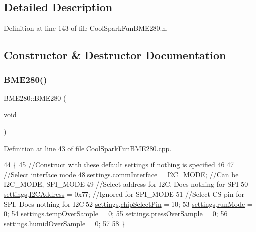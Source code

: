 \subsection{Detailed Description}


Definition at line 143 of file Cool\+Spark\+Fun\+B\+M\+E280.\+h.



\subsection{Constructor \& Destructor Documentation}
\mbox{\label{class_b_m_e280_a9b9354e010528a0c3d452aa2459b808c}} 
\subsubsection{\texorpdfstring{B\+M\+E280()}{BME280()}}
{\footnotesize\ttfamily B\+M\+E280\+::\+B\+M\+E280 (\begin{DoxyParamCaption}\item[{void}]{ }\end{DoxyParamCaption})}



Definition at line 43 of file Cool\+Spark\+Fun\+B\+M\+E280.\+cpp.


\begin{DoxyCode}
44 \{
45     \textcolor{comment}{//Construct with these default settings if nothing is specified}
46 
47     \textcolor{comment}{//Select interface mode}
48     \hyperlink{class_b_m_e280_af06253eb2f8ad4b5fabb858bc4a973bf}{settings}.\hyperlink{struct_sensor_settings_a5bf116387c543a6ea5732976424e8cb1}{commInterface} = \hyperlink{_cool_spark_fun_b_m_e280_8h_a5cd01756030509b764d43a2b8c94fce8}{I2C\_MODE}; \textcolor{comment}{//Can be I2C\_MODE, SPI\_MODE}
49     \textcolor{comment}{//Select address for I2C.  Does nothing for SPI}
50     \hyperlink{class_b_m_e280_af06253eb2f8ad4b5fabb858bc4a973bf}{settings}.\hyperlink{struct_sensor_settings_af8103021dbce7e5ee6d786c4893324f7}{I2CAddress} = 0x77; \textcolor{comment}{//Ignored for SPI\_MODE}
51     \textcolor{comment}{//Select CS pin for SPI.  Does nothing for I2C}
52     \hyperlink{class_b_m_e280_af06253eb2f8ad4b5fabb858bc4a973bf}{settings}.\hyperlink{struct_sensor_settings_abe2de606ebb580ad81e3fafb1a454580}{chipSelectPin} = 10;
53     \hyperlink{class_b_m_e280_af06253eb2f8ad4b5fabb858bc4a973bf}{settings}.\hyperlink{struct_sensor_settings_a0ffbdf34f4c23a2a167f00e4cb971dec}{runMode} = 0;
54     \hyperlink{class_b_m_e280_af06253eb2f8ad4b5fabb858bc4a973bf}{settings}.\hyperlink{struct_sensor_settings_abdedc9d05f4850c58005313486958073}{tempOverSample} = 0;
55     \hyperlink{class_b_m_e280_af06253eb2f8ad4b5fabb858bc4a973bf}{settings}.\hyperlink{struct_sensor_settings_a85ba10cad25b479bba9cb42c6400ab21}{pressOverSample} = 0;
56     \hyperlink{class_b_m_e280_af06253eb2f8ad4b5fabb858bc4a973bf}{settings}.\hyperlink{struct_sensor_settings_a4a02fc7708071b88ccf610e3f7ed9d55}{humidOverSample} = 0;
57 
58 \}
\end{DoxyCode}


